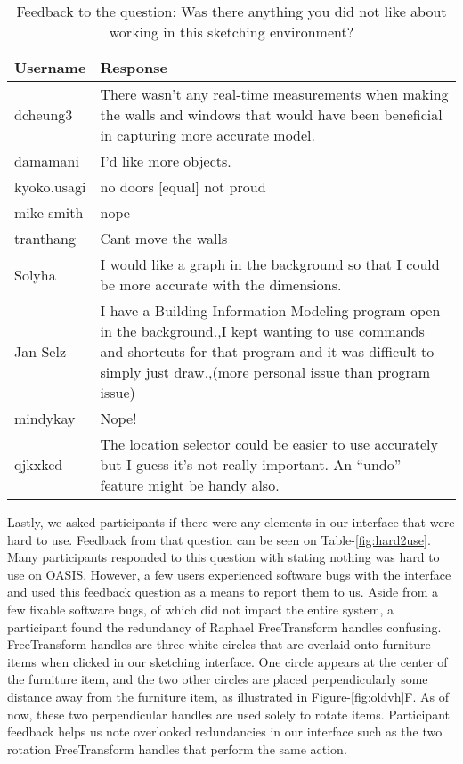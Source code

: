\begin{table}[!ht]
\centering
\begin{tabular}{|p{}|p{}|}
\hline
\rowcolor[HTML]{EFEFEF} 
\textbf{Username} & \textbf{Response} \\ \hline
dcheung3 & There wasn't any real-time measurements when making the walls and windows that would have been beneficial in capturing more accurate model. \\ \hline
damamani & I'd like more objects. \\ \hline
kyoko.usagi & no doors {[}equal{]} not proud \\ \hline
mike smith & nope \\ \hline
tranthang & Cant move the walls \\ \hline
Solyha & I would like a graph in the background so that I could be more accurate with the dimensions. \\ \hline
Jan Selz & I have a Building Information Modeling program open in the background.,I kept wanting to use commands and shortcuts for that program and it was difficult to simply just draw.,(more personal issue than program issue) \\ \hline
mindykay & Nope! \\ \hline
qjkxkcd & The location selector could be easier to use accurately but I guess it's not really important. An ``undo'' feature might be handy also. \\ \hline
\end{tabular}
\caption{Feedback to the question: Was there anything you did not like about working in this sketching environment?}
\label{fig:dislike}
\end{table}



Lastly, we asked participants if there were any elements in our interface that were hard to use.
Feedback from that question can be seen on Table-\ref{fig:hard2use}.
Many participants responded to this question with stating nothing was hard to use on OASIS.
However, a few users experienced software bugs with the interface and used this feedback question as a means to report them to us.
Aside from a few fixable software bugs, of which did not impact the entire system, a participant found the redundancy of Raphael FreeTransform handles confusing.
FreeTransform handles are three white circles that are overlaid onto furniture items when clicked in our sketching interface.
One circle appears at the center of the furniture item, and the two other circles are placed perpendicularly some distance away from the furniture item, as illustrated in Figure-\ref{fig:oldvh}F.
As of now, these two perpendicular handles are used solely to rotate items.
Participant feedback helps us note overlooked redundancies in our interface such as the two rotation FreeTransform handles that perform the same action.\\

